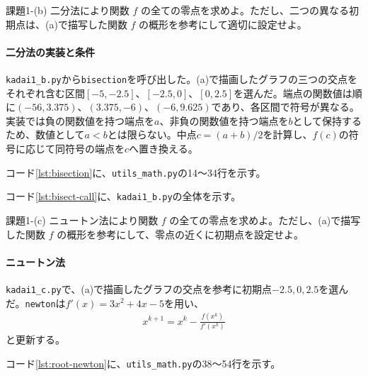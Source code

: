\documentclass[a4j]{jarticle}
\begin{document}
\begin{itembox}[l]{課題1-(b)}
二分法により関数 $f$ の全ての零点を求めよ。ただし、二つの異なる初期点は、(a)で描写した関数 $f$ の概形を参考にして適切に設定せよ。
\end{itembox}
\paragraph{二分法の実装と条件}

\texttt{kadai1\_b.py}から\texttt{bisection}を呼び出した。(a)で描画したグラフの三つの交点をそれぞれ含む区間$[-5,-2.5]$、$[-2.5,0]$、$[0,2.5]$を選んだ。端点の関数値は順に$(-56,3.375)$、$(3.375,-6)$、$(-6,9.625)$であり、各区間で符号が異なる。実装では負の関数値を持つ端点を$a$、非負の関数値を持つ端点を$b$として保持するため、数値として$a<b$とは限らない。中点$c=(a+b)/2$を計算し、$f(c)$の符号に応じて同符号の端点を$c$へ置き換える。

\par\noindent
コード\ref{lst:bisection}に、\texttt{utils\_math.py}の14〜34行を示す。
\par



\par\noindent
コード\ref{lst:bisect-call}に、\texttt{kadai1\_b.py}の全体を示す。
\par




\begin{itembox}[l]{課題1-(c)}
ニュートン法により関数 $f$ の全ての零点を求めよ。ただし、(a)で描写した関数 $f$ の概形を参考にして、零点の近くに初期点を設定せよ。
\end{itembox}
\paragraph{ニュートン法}

\texttt{kadai1\_c.py}で、(a)で描画したグラフの交点を参考に初期点$-2.5,0,2.5$を選んだ。\texttt{newton}は$f'(x)=3x^2+4x-5$を用い、
\begin{align}
  x^{k+1}=x^k-\frac{f(x^k)}{f'(x^k)}
  \label{eq:root-newton}
\end{align}
と更新する。

\par\noindent
コード\ref{lst:root-newton}に、\texttt{utils\_math.py}の38〜54行を示す。
\par

\end{document}
